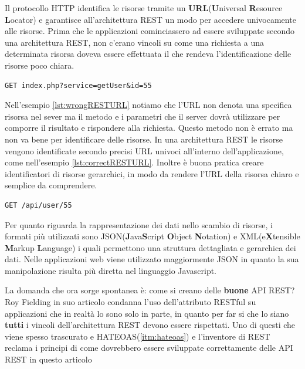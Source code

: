 Il protocollo HTTP identifica le risorse tramite un \textbf{URL}(\textbf{U}niversal \textbf{R}esource \textbf{L}ocator) e garantisce all'architettura REST un modo per accedere univocamente alle risorse.
Prima che le applicazioni cominciassero ad essere sviluppate secondo una architettura REST, non c'erano vincoli su come una richiesta a una determinata risorsa doveva essere effettuata il che rendeva l'identificazione delle risorse poco chiara.
\begin{lstlisting}[caption={Esempio di URL che non rispetta il vincolo di REST}, label={lst:wrongRESTURL}]
	GET index.php?service=getUser&id=55
\end{lstlisting}
Nell'esempio \ref{lst:wrongRESTURL} notiamo che l'URL non denota una specifica risorsa nel sever ma il metodo e i parametri che il server dovrà utilizzare per comporre il risultato e rispondere alla richiesta. Questo metodo non è errato ma non va bene per identificare delle risorse.
In una architettura REST le risorse vengono identificate secondo precisi URL univoci all'interno dell'applicazione, come nell'esempio \ref{lst:correctRESTURL}.
Inoltre è buona pratica creare identificatori di risorse gerarchici, in modo da rendere l'URL della risorsa chiaro e semplice da comprendere.

\begin{lstlisting}[caption={Identificazione di una risorsa all'interno di una architettura REST}, label={lst:correctRESTURL}]
	GET /api/user/55
\end{lstlisting}

Per quanto riguarda la rappresentazione dei dati nello scambio di risorse, i formati più utilizzati sono JSON(\textbf{J}ava\textbf{S}cript \textbf{O}bject \textbf{N}otation) e XML(e\textbf{X}tensible \textbf{M}arkup \textbf{L}anguage) i quali permettono una struttura dettagliata e gerarchica dei dati. Nelle applicazioni web viene utilizzato maggiormente JSON in quanto la sua manipolazione risulta più diretta nel linguaggio Javascript.

La domanda che ora sorge spontanea è: come si creano delle \textbf{buone} API REST? Roy Fielding in suo articolo condanna l'uso dell'attributo RESTful su applicazioni che in realtà lo sono solo in parte, in quanto per far si che lo siano \textbf{tutti} i vincoli dell'architettura REST devono essere rispettati.
Uno di questi che viene spesso trascurato e HATEOAS(\ref{itm:hateoas}) e l'inventore di REST reclama i principi di come dovrebbero essere sviluppate correttamente delle API REST in questo articolo \citep{web:restapi}


